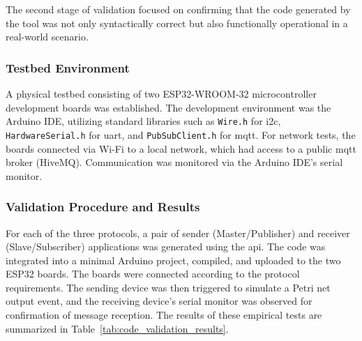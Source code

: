   The second stage of validation focused on confirming that the code generated by the tool was not only syntactically correct but also functionally operational in a real-world scenario.

\subsubsection{Testbed Environment}
  A physical testbed consisting of two ESP32-WROOM-32 microcontroller development boards was established. The development environment was the Arduino IDE, utilizing standard libraries such as \texttt{Wire.h} for \gls{i2c}, \texttt{HardwareSerial.h} for \gls{uart}, and \texttt{PubSubClient.h} for \gls{mqtt}. For network tests, the boards connected via Wi-Fi to a local network, which had access to a public \gls{mqtt} broker (HiveMQ). Communication was monitored via the Arduino IDE's serial monitor.

\subsubsection{Validation Procedure and Results}
For each of the three protocols, a pair of sender (Master/Publisher) and receiver (Slave/Subscriber) applications was generated using the \gls{api}.   The code was integrated into a minimal Arduino project, compiled, and uploaded to the two ESP32 boards.   The boards were connected according to the protocol requirements.   The sending device was then triggered to simulate a Petri net output event, and the receiving device's serial monitor was observed for confirmation of message reception. The results of these empirical tests are summarized in Table~\ref{tab:code_validation_results}.

